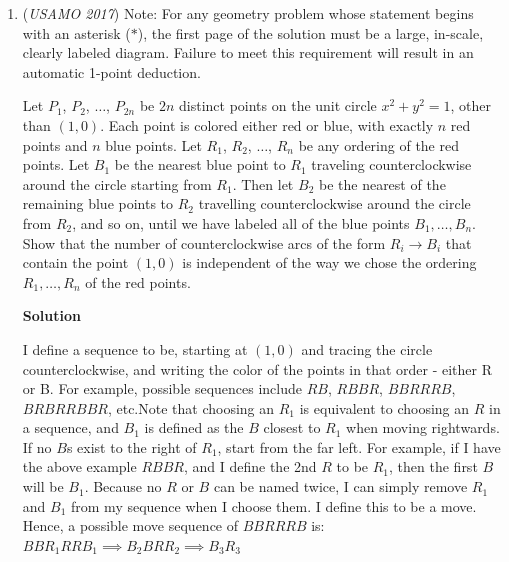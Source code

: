 \begin{enumerate}
 Let $N' = I_\omega (N) \implies R^2 = SN \cdot SN' = SI \cdot  SI' \implies$
 \[\frac {SN'}{SI'} = \frac {SI}{SN} =2 \implies\]$\angle XN'I' = \angle XSI' = 90^\circ – \angle AXI' = \angle IFX \implies N'XIF$ is cyclic. 

 Therefore point $F$ lies on  $I_\omega (AMN) \implies I_\omega(F) = L \implies$

 The points $F, L,$ and $S$ are collinear, $AXFL$ is cyclic.

 Point $I$ is orthocenter $\triangle FSX \implies XI \perp SF, \angle ILS = \angle SI'F = 90^\circ$$\implies$ The points $X, I, E,$ and $L$ are collinear.

 $AXFL$ is circle $\implies AI \cdot IF = IL \cdot XI\implies$
$AI \cdot \frac {IF}{2} = \frac {IL}{2} \cdot IX \implies AI \cdot IM = EI \cdot IX \implies AEMX$ is cyclic.
 \[E \in \Omega.\]\textbf{vladimir.shelomovskii@gmail.com, vvsss}

 \textbf{Contact} Contact v\_Enhance at \href{https://www.facebook.com/v.Enhance}{https://www.facebook.com/v.Enhance}.

 


	\item (\textit{USAMO 2017}) Note: For any geometry problem whose statement begins with an asterisk ($*$), the first page of the solution must be a large, in-scale, clearly labeled diagram. Failure to meet this requirement will result in an automatic 1-point deduction. 


 Let $P_1$, $P_2$, $\dots$, $P_{2n}$ be $2n$ distinct points on the unit circle $x^2+y^2=1$, other than $(1,0)$. Each point is colored either red or blue, with exactly $n$ red points and $n$ blue points. Let $R_1$, $R_2$, $\dots$, $R_n$ be any ordering of the red points. Let $B_1$ be the nearest blue point to $R_1$ traveling counterclockwise around the circle starting from $R_1$. Then let $B_2$ be the nearest of the remaining blue points to $R_2$ travelling counterclockwise around the circle from $R_2$, and so on, until we have labeled all of the blue points $B_1, \dots, B_n$. Show that the number of counterclockwise arcs of the form $R_i \to B_i$ that contain the point $(1,0)$ is independent of the way we chose the ordering $R_1, \dots, R_n$ of the red points.


 



\textbf{Solution}

I define a sequence to be, starting at $(1,0)$ and tracing the circle counterclockwise, and writing the color of the points in that order - either R or B. For example, possible sequences include $RB$, $RBBR$, $BBRRRB$, $BRBRRBBR$, etc.Note that choosing an $R_1$ is equivalent to choosing an $R$ in a sequence, and $B_1$ is defined as the $B$ closest to $R_1$ when moving rightwards. If no $B$s exist to the right of $R_1$, start from the far left. For example, if I have the above example $RBBR$, and I define the 2nd $R$ to be $R_1$, then the first $B$ will be $B_1$. Because no $R$ or $B$ can be named twice, I can simply remove $R_1$ and $B_1$ from my sequence when I choose them. I define this to be a move. Hence, a possible move sequence of $BBRRRB$ is:$BBR_1RRB_1\implies B_2BRR_2\implies B_3R_3$


\end{enumerate}
